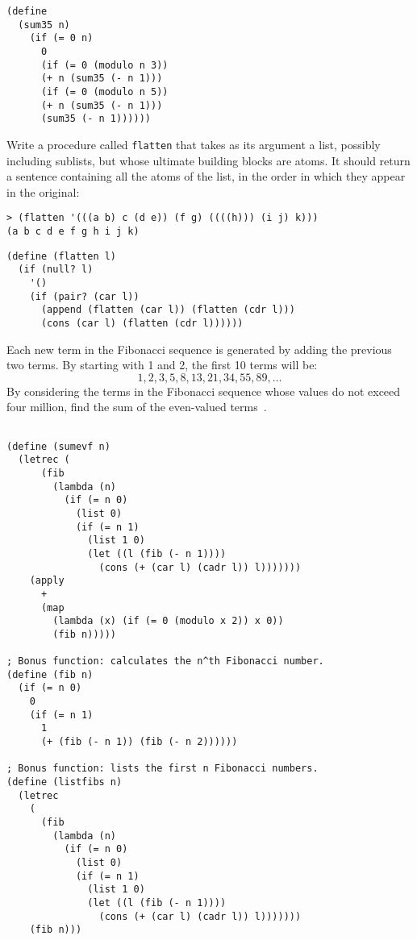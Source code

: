 \documentclass[addpoints,12pt,a4paper]{exam}
\begin{document}
\begin{questions}
\begin{solution}
  \begin{verbatim}
(define 
  (sum35 n)
    (if (= 0 n)
      0
      (if (= 0 (modulo n 3))
      (+ n (sum35 (- n 1)))
      (if (= 0 (modulo n 5))
      (+ n (sum35 (- n 1)))
      (sum35 (- n 1))))))
  \end{verbatim}
\end{solution}

\question
Write a procedure called \texttt{flatten} that takes as its argument a list, possibly including sublists, but whose ultimate building blocks are atoms.
It should return a sentence containing all the atoms of the list, in the order in which they appear in the original:
\begin{verbatim}
> (flatten '(((a b) c (d e)) (f g) ((((h))) (i j) k)))
(a b c d e f g h i j k)
\end{verbatim}

\begin{solution}
  \begin{verbatim}
(define (flatten l)
  (if (null? l)
    '()
    (if (pair? (car l))
      (append (flatten (car l)) (flatten (cdr l)))
      (cons (car l) (flatten (cdr l))))))
  \end{verbatim}
\end{solution}

\question
Each new term in the Fibonacci sequence is generated by adding the previous two terms.
By starting with 1 and 2, the first 10 terms will be:
\[ 1, 2, 3, 5, 8, 13, 21, 34, 55, 89, \ldots \]
By considering the terms in the Fibonacci sequence whose values do not exceed four million, find the sum of the even-valued terms~\cite{projecteuler}.

\begin{solution}
  \begin{verbatim}
 
(define (sumevf n)
  (letrec (
      (fib
        (lambda (n)
          (if (= n 0)
            (list 0)
            (if (= n 1)
              (list 1 0)
              (let ((l (fib (- n 1))))
                (cons (+ (car l) (cadr l)) l)))))))
    (apply
      +
      (map
        (lambda (x) (if (= 0 (modulo x 2)) x 0))
        (fib n)))))

; Bonus function: calculates the n^th Fibonacci number. 
(define (fib n)
  (if (= n 0)
    0
    (if (= n 1)
      1
      (+ (fib (- n 1)) (fib (- n 2))))))

; Bonus function: lists the first n Fibonacci numbers.
(define (listfibs n)
  (letrec
    (
      (fib
        (lambda (n)
          (if (= n 0)
            (list 0)
            (if (= n 1)
              (list 1 0)
              (let ((l (fib (- n 1))))
                (cons (+ (car l) (cadr l)) l)))))))
    (fib n)))
  \end{verbatim}
\end{solution}


\end{questions}
\end{document}
